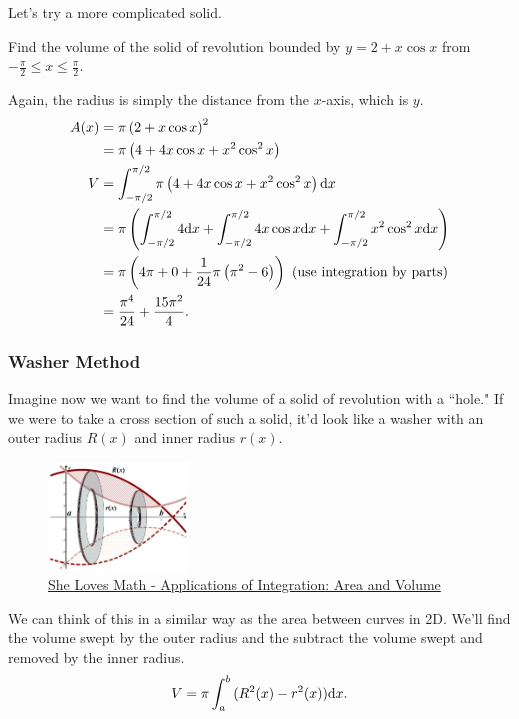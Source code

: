 Let's try a more complicated solid.
\begin{example}
	Find the volume of the solid of revolution bounded by $y=2+x\cos{x}$ from $-\frac{\pi}{2} \leq x \leq \frac{\pi}{2}$.
\end{example}
\begin{answer}
	Again, the radius is simply the distance from the $x$-axis, which is $y$.
	\begin{align*}
		A(x) &= \pi \left(2+x\cos{x}\right)^2 \\
		&= \pi \left(4 + 4x\cos{x} + x^2\cos^2{x}\right) \\
		V &= \int_{-\pi/2}^{\pi/2}{\pi \left(4 + 4x\cos{x} + x^2\cos^2{x}\right)\mathrm{d} x} \\
		&= \pi\left(\int_{-\pi/2}^{\pi/2}{4\mathrm{d} x}+\int_{-\pi/2}^{\pi/2}{4x\cos{x}\mathrm{d} x}+\int_{-\pi/2}^{\pi/2}{x^2\cos^2{x}\mathrm{d} x}\right) \\
		&= \pi\left(4\pi + 0 + \frac{1}{24}\pi\left(\pi^2-6\right)\right) \text{ (use integration by parts)}\\
		&= \frac{\pi^4}{24} + \frac{15\pi^2}{4}.
	\end{align*}
\end{answer}

\subsubsection{Washer Method}
Imagine now we want to find the volume of a solid of revolution with a ``hole."
If we were to take a cross section of such a solid, it'd look like a washer with an outer radius $R(x)$ and inner radius $r(x)$.

\begin{figure}[H]
	\label{washers}
	\centering
	\includegraphics[width=0.33\textwidth]{./applications_integrals/Washer-1.png}
	\caption{\hyperref{https://www.shelovesmath.com/calculus/integral-calculus/applications-integration-area-volume/}{}{}{She Loves Math - Applications of Integration: Area and Volume}}
\end{figure}


We can think of this in a similar way as the area between curves in 2D.
We'll find the volume swept by the outer radius and the subtract the volume swept and removed by the inner radius.
\begin{equation*}
	V = \pi\int_{a}^{b}{(R^2(x)-r^2(x))\mathrm{d} x}.
\end{equation*}

